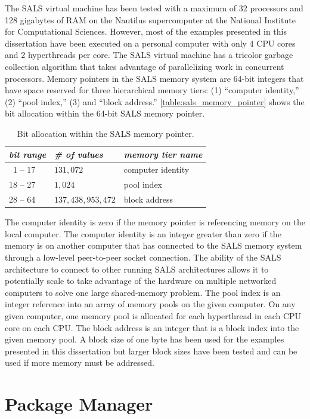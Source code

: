 The SALS virtual machine has been tested with a maximum of 32
processors and 128 gigabytes of RAM on the Nautilus supercomputer at
the National Institute for Computational Sciences.  However, most of
the examples presented in this dissertation have been executed on a
personal computer with only 4 CPU cores and 2 hyperthreads per core.
The SALS virtual machine has a tricolor garbage collection algorithm
that takes advantage of parallelizing work in concurrent processors.
Memory pointers in the SALS memory system are 64-bit integers that
have space reserved for three hierarchical memory tiers: (1)
``computer identity,'' (2) ``pool index,'' (3) and ``block address.''
{\mbox{\autoref{table:sals_memory_pointer}}} shows the bit allocation
within the 64-bit SALS memory pointer.
\begin{table}
\centering
\begin{tabular}{|l|l|l|}
\hline
\emph{bit range} &\emph{\# of values} &\emph{memory tier name} \\
\hline
~1 -- 17 &$131,072$         &computer identity \\ %
\hline
18 -- 27 &$1,024$           &pool index        \\ %
\hline
28 -- 64 &$137,438,953,472$ &block address     \\ %
\hline
\end{tabular}
\caption[Bit allocation within the SALS memory pointer.]{Bit
  allocation within the SALS memory pointer.}
\label{table:sals_memory_pointer}
\end{table}
The computer identity is zero if the memory pointer is referencing
memory on the local computer.  The computer identity is an integer
greater than zero if the memory is on another computer that has
connected to the SALS memory system through a low-level peer-to-peer
socket connection.  The ability of the SALS architecture to connect to
other running SALS architectures allows it to potentially scale to
take advantage of the hardware on multiple networked computers to
solve one large shared-memory problem.  The pool index is an integer
reference into an array of memory pools on the given computer.  On any
given computer, one memory pool is allocated for each hyperthread in
each CPU core on each CPU.  The block address is an integer that is a
block index into the given memory pool.  A block size of one byte has
been used for the examples presented in this dissertation but larger
block sizes have been tested and can be used if more memory must be
addressed.

\section{Package Manager}

